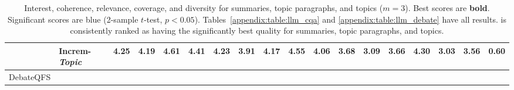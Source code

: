 \begin{table*}[t]
\begin{tabular}{@{}clccccccccccccccc|c@{}}
 & \multicolumn{1}{l|}{Increm-\textit{Topic}} & \cellcolor[HTML]{DAE8FC}\textbf{4.25} & \cellcolor[HTML]{DAE8FC}4.19 & \cellcolor[HTML]{DAE8FC}4.61 & \cellcolor[HTML]{DAE8FC}4.41 & \multicolumn{1}{c|}{\cellcolor[HTML]{DAE8FC}4.23} & \cellcolor[HTML]{DAE8FC}3.91 & \cellcolor[HTML]{DAE8FC}4.17 & \cellcolor[HTML]{DAE8FC}4.55 & \cellcolor[HTML]{DAE8FC}4.06 & \multicolumn{1}{c|}{\cellcolor[HTML]{DAE8FC}3.68} & 3.09 & 3.66 & 4.30 & 3.03 & 3.56 & 0.60 \\ \bottomrule
\multirow{-7}{*}{DebateQFS} %
\end{tabular}
\vspace{-3.5ex}
\caption{\label{table:llm_eval} Interest, coherence, relevance, coverage, and diversity for summaries, topic paragraphs, and topics ($m=3$). Best scores are \textbf{bold}. Significant scores are \colorbox{myblue}{blue} (2-sample $t$-test, $p<0.05$). Tables~\ref{appendix:table:llm_cqa} and \ref{appendix:table:llm_debate} have all results. \model is consistently ranked as having the significantly best quality for summaries, topic paragraphs, and topics.
}
\end{table*}
